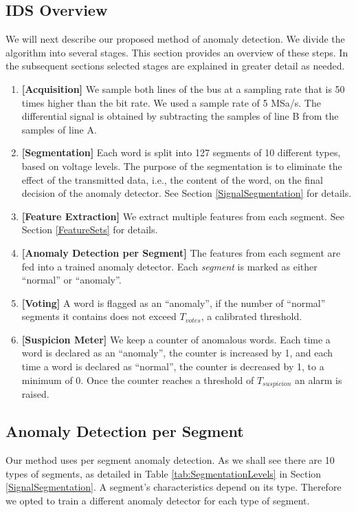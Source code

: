 \documentclass[compsoc,conference,a4paper]{IEEEtran}
\newcommand{\sublevel}[1]{\subsection{#1}}
\newcommand{\sublevel}[1]{\section{#1}}
\begin{document}
\sublevel{IDS Overview} \label{Overview}
  We will next describe our proposed method of anomaly detection. We divide the algorithm into several stages. This section provides an overview of these steps. In the subsequent sections selected stages are explained in greater detail as needed.
  
  \begin{enumerate}
    \item \textbf{[Acquisition]}
          We sample both lines of the bus at a sampling rate that is 50 times higher than the bit rate. We used a sample rate of 5 MSa/s. The differential signal is obtained by subtracting the samples of line B from the samples of line A.
    \item \textbf{[Segmentation]}
          Each word is split into 127 segments of 10 different types, based on voltage levels. The purpose of the segmentation is to eliminate the effect of the transmitted data, i.e., the content of the word, on the final decision of the anomaly detector. See Section \ref{SignalSegmentation} for details.
    \item \textbf{[Feature Extraction]}
          We extract multiple features from each segment. See Section \ref{FeatureSets} for details.
    \item \textbf{[Anomaly Detection per Segment]}
          The features from each segment are fed into a trained anomaly detector. Each \textit{segment} is marked as either ``normal'' or ``anomaly''.
    \item \textbf{[Voting]}
          A word is flagged as an ``anomaly'', if the number of ``normal'' segments it contains does not exceed $T_{votes}$, a calibrated threshold.
    \item \textbf{[Suspicion Meter]}
          We keep a counter of anomalous words. Each time a word is declared as an ``anomaly'', the counter is increased by 1, and each time a word is declared as ``normal'', the counter is decreased by 1, to a minimum of 0. Once the counter reaches a threshold of $T_{suspicion}$ an alarm is raised.
  \end{enumerate}
  
\sublevel{Anomaly Detection per Segment}
  Our method uses per segment anomaly detection. As we shall see there are 10 types of segments, as detailed in Table \ref{tab:SegmentationLevels} in Section \ref{SignalSegmentation}. A segment's characteristics depend on its type. Therefore we opted to train a different anomaly detector for each type of segment.
  
\end{document}
